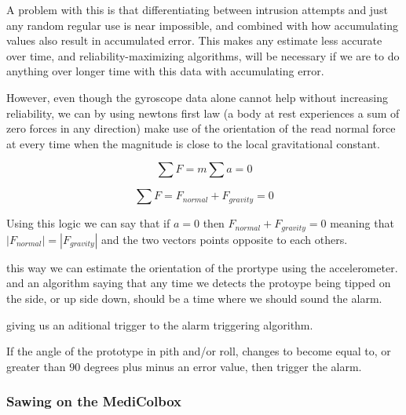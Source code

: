 \documentclass[../main.tex]{subfiles}
\begin{document}
A problem with this is that differentiating between intrusion attempts and just any random regular use is near impossible, and combined with how accumulating values also result in accumulated error. This makes any estimate less accurate over time, and reliability-maximizing algorithms, will be necessary if we are to do anything over longer time with this data with accumulating error.

However, even though the gyroscope data alone cannot help without increasing reliability, we can by using newtons first law (a body at rest experiences a sum of zero forces in any direction) make use of the orientation of the read normal force at every time when the magnitude is close to the local gravitational constant.

$$\sum F = m \sum a = 0$$

$$\sum F = F_{normal} + F_{gravity} = 0$$

Using this logic we can say that if $a=0$ then $F_{normal} + F_{gravity} = 0$ meaning that $|F_{normal}| = |F_{gravity}|$ and the two vectors points opposite to each others.

this way we can estimate the orientation of the prortype using the accelerometer. and an algorithm saying that any time we detects the protoype being tipped on the side, or up side down, should be a time where we should sound the alarm.

giving us an aditional trigger to the alarm triggering algorithm.

If the angle of the prototype in pith and/or roll, changes to become equal to, or greater than $90$ degrees plus minus an error value, then trigger the alarm.



\vspace{30px}

\subsubsection{Sawing on the MediColbox}
\end{document}
